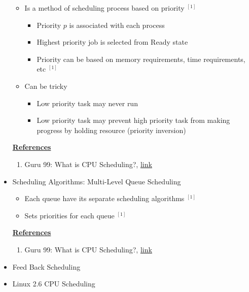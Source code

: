 \documentclass[12pt]{article}
\begin{document}
\begin{itemize}
    \begin{itemize}
        \item Is a method of scheduling process based on priority $^{[1]}$
        \begin{itemize}
            \item Priority $p$ is associated with each process
            \item Highest priority job is selected from Ready state
            \item Priority can be based on memory requirements, time requirements, etc $^{[1]}$
        \end{itemize}
        \item Can be tricky
        \begin{itemize}
            \item Low priority task may never run
            \item Low priority task may prevent high priority task from making progress
            by holding resource (priority inversion)
        \end{itemize}
    \end{itemize}

    \underline{\textbf{References}}

    \begin{enumerate}[1)]
        \item Guru 99: What is CPU Scheduling?, \href{https://www.guru99.com/cpu-scheduling-algorithms.html#8}{link}
    \end{enumerate}

    \item Scheduling Algorithms: Multi-Level Queue Scheduling
    \begin{itemize}
        \item Each queue have its separate scheduling algorithms $^{[1]}$
        \item Sets priorities for each queue $^{[1]}$
    \end{itemize}

    \bigskip

    \underline{\textbf{References}}

    \begin{enumerate}[1)]
        \item Guru 99: What is CPU Scheduling?, \href{https://www.guru99.com/cpu-scheduling-algorithms.html#8}{link}
    \end{enumerate}
    \item Feed Back Scheduling
    \item Linux 2.6 CPU Scheduling
\end{itemize}
\end{document}
